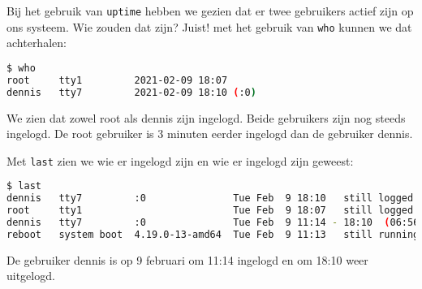 Bij het gebruik van \texttt{uptime} hebben we gezien dat er twee gebruikers actief zijn op ons systeem. Wie zouden dat zijn? Juist! met het gebruik van \texttt{who} kunnen we dat achterhalen:
\begin{lstlisting}[language=bash]
$ who
root     tty1         2021-02-09 18:07
dennis   tty7         2021-02-09 18:10 (:0)
\end{lstlisting}
We zien dat zowel root als dennis zijn ingelogd. Beide gebruikers zijn nog steeds ingelogd. De root gebruiker is 3 minuten eerder ingelogd dan de gebruiker dennis.

Met \texttt{last} zien we wie er ingelogd zijn en wie er ingelogd zijn geweest:
\begin{lstlisting}[language=bash]
$ last
dennis   tty7         :0               Tue Feb  9 18:10   still logged in
root     tty1                          Tue Feb  9 18:07   still logged in
dennis   tty7         :0               Tue Feb  9 11:14 - 18:10  (06:56)
reboot   system boot  4.19.0-13-amd64  Tue Feb  9 11:13   still running
\end{lstlisting}
De gebruiker dennis is op 9 februari om 11:14 ingelogd en om 18:10 weer uitgelogd.
